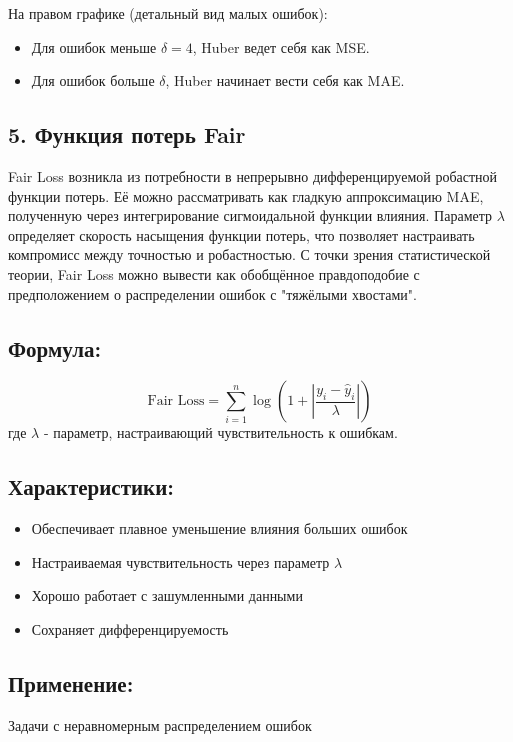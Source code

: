 \documentclass[12pt]{article}
\theoremstyle{definition}
\theoremstyle{definition}
\theoremstyle{definition}
\theoremstyle{remark}
\theoremstyle{remark}
\begin{document}
На правом графике (детальный вид малых ошибок):
\begin{itemize}
    \item Для ошибок меньше $\delta=4$, Huber ведет себя как MSE.
    \item Для ошибок больше $\delta$, Huber начинает вести себя как MAE.
\end{itemize}

\subsection*{5. Функция потерь Fair}

Fair Loss возникла из потребности в непрерывно дифференцируемой робастной функции потерь. Её можно рассматривать как гладкую аппроксимацию MAE, полученную через интегрирование сигмоидальной функции влияния. Параметр $\lambda$ определяет скорость насыщения функции потерь, что позволяет настраивать компромисс между точностью и робастностью. С точки зрения статистической теории, Fair Loss можно вывести как обобщённое правдоподобие с предположением о распределении ошибок с "тяжёлыми хвостами".

\subsection*{Формула:}

\[
\text{Fair Loss} = \sum_{i=1}^{n} \log\left(1 + \left|\frac{y_i - \hat{y}_i}{\lambda}\right|\right)
\]
где $\lambda$ - параметр, настраивающий чувствительность к ошибкам.

\subsection*{Характеристики:}
\begin{itemize}
    \item Обеспечивает плавное уменьшение влияния больших ошибок
    \item Настраиваемая чувствительность через параметр $\lambda$
    \item Хорошо работает с зашумленными данными
    \item Сохраняет дифференцируемость
\end{itemize}

\subsection*{Применение:} Задачи с неравномерным распределением ошибок
\end{document}
